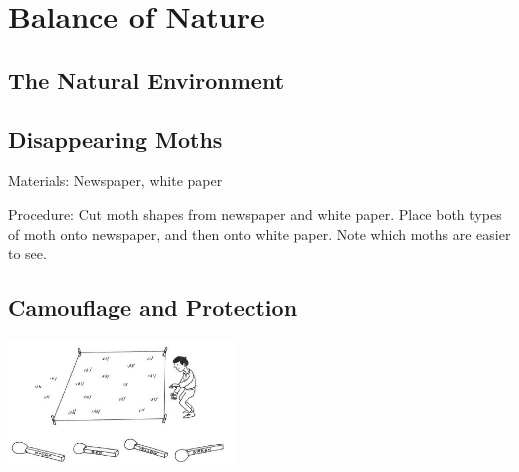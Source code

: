 \section{Balance of Nature}

\begin{multicols}{2}



\section*{The Natural Environment}


\subsection{Disappearing Moths} %


\begin{description*}
\item[Materials:]{Newspaper, white paper}
\item[Procedure:]{Cut moth shapes from newspaper
and white paper. Place both types
of moth onto newspaper, and
then onto white paper. Note
which moths are easier to see.}
\end{description*}

\subsection{Camouflage and Protection} %

\begin{center}
\includegraphics[width=0.45\textwidth]{./img/vso/camouflage-protection.jpg}
\end{center}


\end{multicols}
